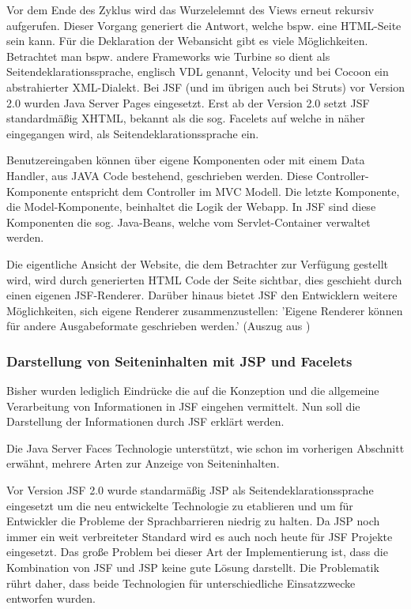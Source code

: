 \documentclass[12pt, twoside, a4paper, ngerman]{article}
\begin{document}
Vor dem Ende des Zyklus wird das Wurzelelemnt des Views erneut rekursiv aufgerufen. Dieser Vorgang generiert die Antwort, welche bspw. eine HTML-Seite sein kann. Für die Deklaration der Webansicht
gibt es viele Möglichkeiten.
Betrachtet man bspw. andere Frameworks wie \gls{Turbine} so dient als Seitendeklarationssprache, englisch \ac{VDL} genannt, \gls{Velocity} und bei \gls{Cocoon} ein abstrahierter XML-Dialekt. Bei JSF (und im übrigen auch bei \gls{Struts}) vor Version 2.0 wurden Java Server Pages eingesetzt.
Erst ab der Version 2.0 setzt JSF standardmäßig XHTML, bekannt als die sog. Facelets auf welche in  näher eingegangen wird, als Seitendeklarationssprache ein. 

Benutzereingaben können über eigene Komponenten oder mit einem Data Handler, aus JAVA Code bestehend, geschrieben werden. Diese Controller-Komponente entspricht dem Controller im \ac{MVC} Modell.
Die letzte Komponente, die Model-Komponente, beinhaltet die Logik der Webapp. In JSF sind diese Komponenten die sog. \gls{Java-Beans}, welche vom Servlet-Container verwaltet werden.

Die eigentliche Ansicht der Website, die dem Betrachter zur Verfügung gestellt wird, wird durch generierten HTML Code der Seite sichtbar, dies geschieht durch einen eigenen JSF-Renderer.
Darüber hinaus bietet JSF den Entwicklern weitere Möglichkeiten, sich eigene Renderer zusammenzustellen: 'Eigene Renderer können für andere Ausgabeformate geschrieben werden.' (Auszug aus \cite{WikiJSF01})

\subsubsection{Darstellung von Seiteninhalten mit JSP und Facelets}\label{subsec:Darstellung von Seiteninhalten}
Bisher wurden lediglich Eindrücke die auf die Konzeption und die allgemeine Verarbeitung von Informationen in JSF eingehen vermittelt. Nun soll die Darstellung der Informationen durch JSF erklärt werden.

Die Java Server Faces Technologie unterstützt, wie schon im vorherigen Abschnitt erwähnt, mehrere Arten zur Anzeige von Seiteninhalten. 

Vor Version JSF 2.0 wurde standarmäßig JSP als Seitendeklarationssprache eingesetzt um die neu entwickelte Technologie zu etablieren und um für Entwickler die Probleme der Sprachbarrieren niedrig zu halten.
Da JSP noch immer ein weit verbreiteter Standard wird es auch noch heute für JSF Projekte eingesetzt.
Das große Problem bei dieser Art der Implementierung ist, dass die Kombination von JSF und JSP keine gute Lösung darstellt. Die Problematik rührt daher, dass beide Technologien für unterschiedliche Einsatzzwecke entworfen wurden.
\end{document}
